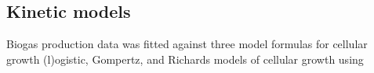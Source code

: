 \subsection{Kinetic models}
Biogas production data was fitted against three model formulas for cellular growth (l)ogistic, Gompertz, and
Richards models of cellular growth using  